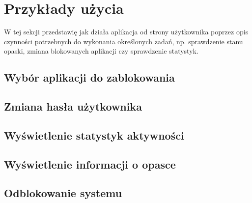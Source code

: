 \section{Przykłady użycia}
W tej sekcji przedstawię jak działa aplikacja od strony użytkownika poprzez opis czynności potrzebnych do wykonania określonych zadań, np. sprawdzenie stanu opaski, zmiana blokowanych aplikacji czy sprawdzenie statystyk.
\subsection{Wybór aplikacji do zablokowania}
\subsection{Zmiana hasła użytkownika}
\subsection{Wyświetlenie statystyk aktywności}
\subsection{Wyświetlenie informacji o opasce}
\subsection{Odblokowanie systemu}